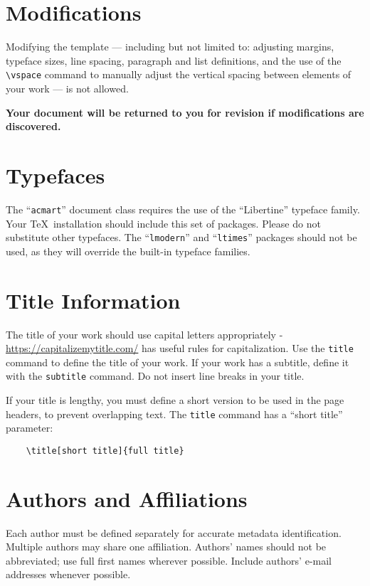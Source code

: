 \documentclass[acmtog]{acmart}
\begin{document}
	\section{Modifications}
	
	Modifying the template --- including but not limited to: adjusting
	margins, typeface sizes, line spacing, paragraph and list definitions,
	and the use of the \verb|\vspace| command to manually adjust the
	vertical spacing between elements of your work --- is not allowed.
	
	{\bfseries Your document will be returned to you for revision if
		modifications are discovered.}
	
	\section{Typefaces}
	
	The ``\verb|acmart|'' document class requires the use of the
	``Libertine'' typeface family. Your \TeX\ installation should include
	this set of packages. Please do not substitute other typefaces. The
	``\verb|lmodern|'' and ``\verb|ltimes|'' packages should not be used,
	as they will override the built-in typeface families.
	
	\section{Title Information}
	
	The title of your work should use capital letters appropriately -
	\url{https://capitalizemytitle.com/} has useful rules for
	capitalization. Use the {\verb|title|} command to define the title of
	your work. If your work has a subtitle, define it with the
	{\verb|subtitle|} command.  Do not insert line breaks in your title.
	
	If your title is lengthy, you must define a short version to be used
	in the page headers, to prevent overlapping text. The \verb|title|
	command has a ``short title'' parameter:
	\begin{verbatim}
	\title[short title]{full title}
	\end{verbatim}
	
	\section{Authors and Affiliations}
	
	Each author must be defined separately for accurate metadata
	identification. Multiple authors may share one affiliation. Authors'
	names should not be abbreviated; use full first names wherever
	possible. Include authors' e-mail addresses whenever possible.
	
\end{document}
